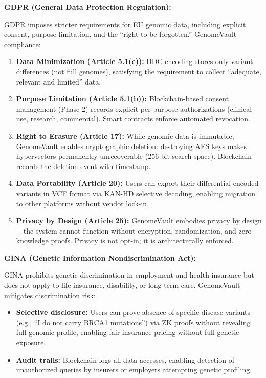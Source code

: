 \documentclass[12pt,a4paper]{article}
\begin{document}
\textbf{GDPR (General Data Protection Regulation):}

GDPR imposes stricter requirements for EU genomic data, including explicit consent, purpose limitation, and the ``right to be forgotten.'' GenomeVault compliance:

\begin{enumerate}
\item \textbf{Data Minimization (Article 5.1(c)):} HDC encoding stores only variant differences (not full genomes), satisfying the requirement to collect ``adequate, relevant and limited'' data.
\item \textbf{Purpose Limitation (Article 5.1(b)):} Blockchain-based consent management (Phase 2) records explicit per-purpose authorizations (clinical use, research, commercial). Smart contracts enforce automated revocation.
\item \textbf{Right to Erasure (Article 17):} While genomic data is immutable, GenomeVault enables cryptographic deletion: destroying AES keys makes hypervectors permanently unrecoverable (256-bit search space). Blockchain records the deletion event with timestamp.
\item \textbf{Data Portability (Article 20):} Users can export their differential-encoded variants in VCF format via KAN-HD selective decoding, enabling migration to other platforms without vendor lock-in.
\item \textbf{Privacy by Design (Article 25):} GenomeVault embodies privacy by design---the system cannot function without encryption, randomization, and zero-knowledge proofs. Privacy is not opt-in; it is architecturally enforced.
\end{enumerate}

\textbf{GINA (Genetic Information Nondiscrimination Act):}

GINA prohibits genetic discrimination in employment and health insurance but does not apply to life insurance, disability, or long-term care. GenomeVault mitigates discrimination risk:

\begin{itemize}
\item \textbf{Selective disclosure:} Users can prove absence of specific disease variants (e.g., ``I do not carry BRCA1 mutations'') via ZK proofs without revealing full genomic profile, enabling fair insurance pricing without full genetic exposure.
\item \textbf{Audit trails:} Blockchain logs all data accesses, enabling detection of unauthorized queries by insurers or employers attempting genetic profiling.
\end{itemize}
\end{document}
